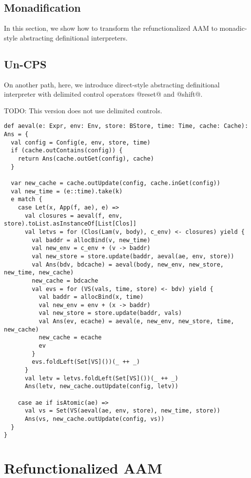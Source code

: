 \documentclass[acmsmall,review,anonymous]{acmart}\settopmatter{printfolios=true,printccs=false,printacmref=false}
\begin{document}
\subsection{Monadification} \label{monadify}

In this section, we show how to transform the refunctionalized AAM to monadic-style
abstracting definitional interpreters.

\subsection{Un-CPS} \label{uncps}

On another path, here, we introduce direct-style abstracting definitional interpreter
with delimited control operators @reset@ and @shift@.

TODO: This version does not use delimited controls.

\begin{lstlisting}
def aeval(e: Expr, env: Env, store: BStore, time: Time, cache: Cache): Ans = {
  val config = Config(e, env, store, time)
  if (cache.outContains(config)) {
    return Ans(cache.outGet(config), cache)
  }

  var new_cache = cache.outUpdate(config, cache.inGet(config))
  val new_time = (e::time).take(k)
  e match {
    case Let(x, App(f, ae), e) =>
      val closures = aeval(f, env, store).toList.asInstanceOf[List[Clos]]
      val letvs = for (Clos(Lam(v, body), c_env) <- closures) yield {
        val baddr = allocBind(v, new_time)
        val new_env = c_env + (v -> baddr)
        val new_store = store.update(baddr, aeval(ae, env, store))
        val Ans(bdv, bdcache) = aeval(body, new_env, new_store, new_time, new_cache)
        new_cache = bdcache
        val evs = for (VS(vals, time, store) <- bdv) yield {
          val baddr = allocBind(x, time)
          val new_env = env + (x -> baddr)
          val new_store = store.update(baddr, vals)
          val Ans(ev, ecache) = aeval(e, new_env, new_store, time, new_cache)
          new_cache = ecache
          ev
        }
        evs.foldLeft(Set[VS]())(_ ++ _)
      }
      val letv = letvs.foldLeft(Set[VS]())(_ ++ _)
      Ans(letv, new_cache.outUpdate(config, letv))

    case ae if isAtomic(ae) =>
      val vs = Set(VS(aeval(ae, env, store), new_time, store))
      Ans(vs, new_cache.outUpdate(config, vs))
  }
}
\end{lstlisting}

\section{Refunctionalized AAM}
\end{document}
